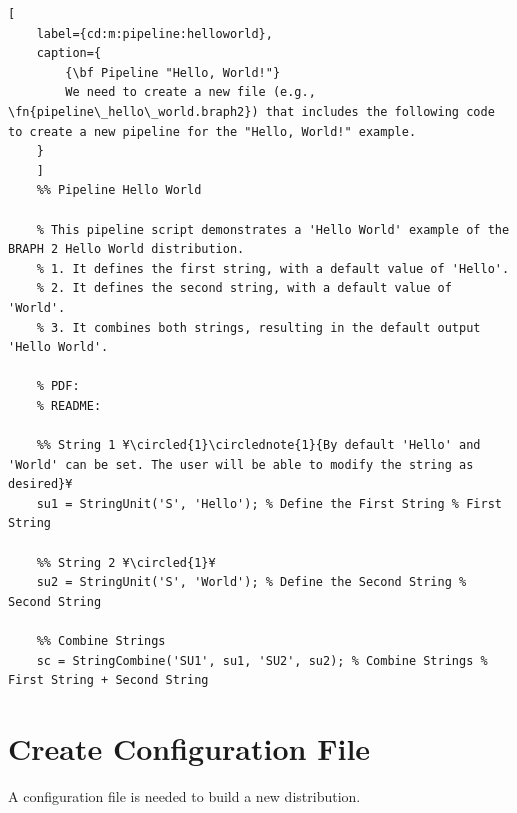\documentclass{tufte-handout}
\begin{document}
\begin{lstlisting}[
	label={cd:m:pipeline:helloworld},
	caption={
		{\bf Pipeline "Hello, World!"}
		We need to create a new file (e.g., \fn{pipeline\_hello\_world.braph2}) that includes the following code to create a new pipeline for the "Hello, World!" example.
	}
	]
	%% Pipeline Hello World

	% This pipeline script demonstrates a 'Hello World' example of the BRAPH 2 Hello World distribution.
	% 1. It defines the first string, with a default value of 'Hello'.
	% 2. It defines the second string, with a default value of 'World'.
	% 3. It combines both strings, resulting in the default output 'Hello World'.
	
	% PDF: 
	% README: 
	
	%% String 1 ¥\circled{1}\circlednote{1}{By default 'Hello' and 'World' can be set. The user will be able to modify the string as desired}¥
	su1 = StringUnit('S', 'Hello'); % Define the First String % First String
	
	%% String 2 ¥\circled{1}¥
	su2 = StringUnit('S', 'World'); % Define the Second String % Second String
	
	%% Combine Strings
	sc = StringCombine('SU1', su1, 'SU2', su2); % Combine Strings % First String + Second String
\end{lstlisting}

\clearpage
\section{Create Configuration File}

A configuration file is needed to build a new distribution.
\end{document}
